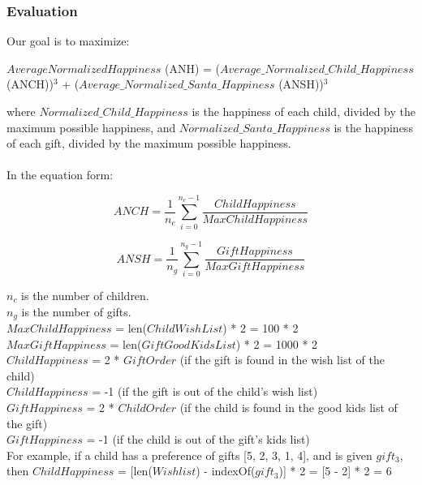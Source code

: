\documentclass[12pt]{article}
\begin{document}
\subsubsection{Evaluation}
Our goal is to maximize: \\
\begin{center}
  $Average Normalized Happiness$ (ANH) = ($Average\_Normalized\_Child\_Happiness$ (ANCH))$^3$ + ($Average\_Normalized\_Santa\_Happiness$ (ANSH))$^3$
\end{center}
where $Normalized\_Child\_Happiness$ is the happiness of each child, divided by the maximum possible happiness, and $Normalized\_Santa\_Happiness$ is the happiness of each gift, divided by the maximum possible happiness.\\
\\
In the equation form: \\
\begin{center}
  \begin{displaymath}
  ANCH = \frac{1}{n_c}\sum_{i=0}^{n_c -1}\frac{ChildHappiness}{MaxChildHappiness}
  \end{displaymath}
\end{center}
\begin{center}
  \begin{displaymath}
  ANSH = \frac{1}{n_g}\sum_{i=0}^{n_g -1}\frac{GiftHappiness}{MaxGiftHappiness}
  \end{displaymath}
\end{center}
$n_c$ is the number of children. \\
$n_g$ is the number of gifts. \\
$MaxChildHappiness$ = len($ChildWishList$) * 2 = 100 * 2 \\
$MaxGiftHappiness$ = len($GiftGoodKidsList$) * 2 = 1000 * 2 \\
$ChildHappiness$ = 2 * $GiftOrder$ (if the gift is found in the wish list of the child)\\
$ChildHappiness$ = -1 (if the gift is out of the child's wish list) \\
$GiftHappiness$ = 2 * $ChildOrder$ (if the child is found in the good kids list of the gift)\\
$GiftHappiness$ = -1 (if the child is out of the gift's kids list)\\
For example, if a child has a preference of gifts [5, 2, 3, 1, 4], and is given $gift_3$, then $ChildHappiness$ = [len($Wishlist$) - indexOf($gift_3$)] * 2 = [5 - 2] * 2 = 6
\end{document}
